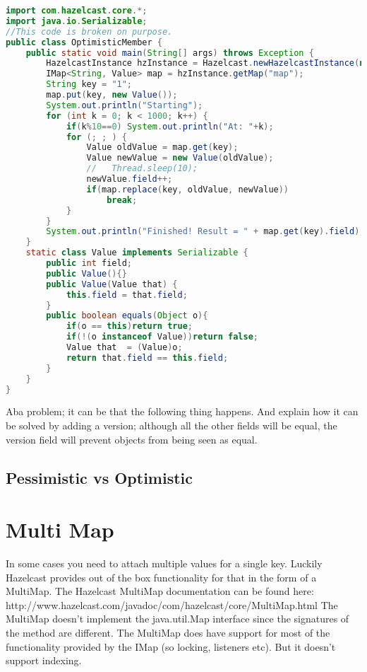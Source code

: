 \begin{lstlisting}[language=java]
import com.hazelcast.core.*;
import java.io.Serializable;
//This code is broken on purpose.
public class OptimisticMember {
    public static void main(String[] args) throws Exception {
        HazelcastInstance hzInstance = Hazelcast.newHazelcastInstance(null);
        IMap<String, Value> map = hzInstance.getMap("map");
        String key = "1";
        map.put(key, new Value());
        System.out.println("Starting");
        for (int k = 0; k < 1000; k++) {
            if(k%10==0) System.out.println("At: "+k);
            for (; ; ) {
                Value oldValue = map.get(key);
                Value newValue = new Value(oldValue);
                //   Thread.sleep(10);
                newValue.field++;
                if(map.replace(key, oldValue, newValue))
                    break;
            }
        }
        System.out.println("Finished! Result = " + map.get(key).field);
    }
    static class Value implements Serializable {
        public int field;
        public Value(){}
        public Value(Value that) {
            this.field = that.field;
        }
        public boolean equals(Object o){
            if(o == this)return true;
            if(!(o instanceof Value))return false;
            Value that  = (Value)o;
            return that.field == this.field;
        }
    }
}
\end{lstlisting}

Aba problem; it can be that the following thing happens. And explain how it can be solved by adding a version; although all the other fields will be equal, the version field will prevent objects from being seen as equal.

\subsection{Pessimistic vs Optimistic}

\section{Multi Map}

In some cases you need to attach multiple values for a single key. Luckily Hazelcast provides out of the box functionality for that in the form of a MultiMap. The Hazelcast MultiMap documentation can be found here: http://www.hazelcast.com/javadoc/com/hazelcast/core/MultiMap.html
The MultiMap doesn't implement the java.util.Map interface since the signatures of the method are different. The MultiMap does have support for most of the functionality provided by the IMap (so locking, listeners etc). But it doesn't support indexing.

